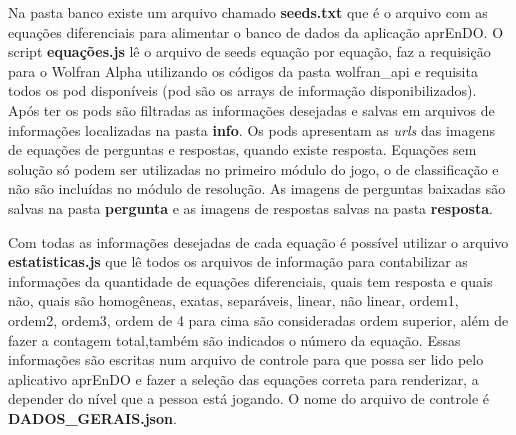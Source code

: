 Na pasta banco existe um arquivo chamado \textbf{seeds.txt} que é o arquivo com as equações diferenciais para alimentar o banco de dados da aplicação aprEnDO. O script \textbf{equações.js} lê o arquivo de seeds equação por equação, faz a requisição para o Wolfran Alpha utilizando os códigos da pasta wolfran\_api e requisita todos os pod disponíveis (pod são os arrays de informação disponibilizados). Após ter os pods são filtradas as informações desejadas e salvas em arquivos de informações localizadas na pasta \textbf{info}. Os pods apresentam as \textit{urls} das imagens de equações de perguntas e respostas, quando existe resposta. Equações sem solução só podem ser utilizadas no primeiro módulo do jogo, o de classificação e não são incluídas no módulo de resolução. As imagens de perguntas baixadas são salvas na pasta \textbf{pergunta} e as imagens de respostas salvas na pasta \textbf{resposta}.

Com todas as informações desejadas de cada equação é possível utilizar o arquivo \textbf{estatisticas.js} que lê todos os arquivos de informação para contabilizar as informações da quantidade de equações diferenciais, quais tem resposta e quais não, quais são homogêneas, exatas, separáveis, linear, não linear, ordem1, ordem2, ordem3, ordem de 4 para cima são consideradas ordem superior, além de fazer a contagem total,também são indicados o número da equação. Essas informações são escritas num arquivo de controle para que possa ser lido pelo aplicativo aprEnDO e fazer a seleção das equações correta para renderizar, a depender do nível que a pessoa está jogando. O nome do arquivo de controle é \textbf{DADOS\_GERAIS.json}.
